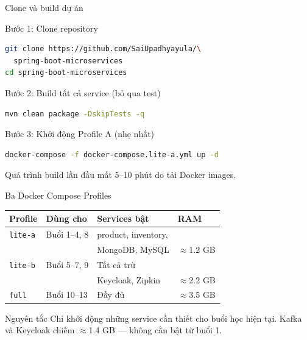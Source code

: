 \documentclass[aspectratio=169,12pt]{beamer}
\begin{document}
\begin{frame}[fragile]{Clone và build dự án}
  \begin{block}{Bước 1: Clone repository}
\begin{lstlisting}[language=bash]
git clone https://github.com/SaiUpadhyayula/\
  spring-boot-microservices
cd spring-boot-microservices
\end{lstlisting}
  \end{block}

  \begin{block}{Bước 2: Build tất cả service (bỏ qua test)}
\begin{lstlisting}[language=bash]
mvn clean package -DskipTests -q
\end{lstlisting}
  \end{block}

  \begin{block}{Bước 3: Khởi động Profile A (nhẹ nhất)}
\begin{lstlisting}[language=bash]
docker-compose -f docker-compose.lite-a.yml up -d
\end{lstlisting}
  \end{block}

  Quá trình build lần đầu mất 5--10 phút do tải Docker images.
\end{frame}

\begin{frame}{Ba Docker Compose Profiles}
  \begin{center}
  \begin{tabular}{llll}
    \toprule
    \textbf{Profile} & \textbf{Dùng cho} & \textbf{Services bật} & \textbf{RAM} \\
    \midrule
    \texttt{lite-a} &
    Buổi 1--4, 8 &
    product, inventory,\\
    & & MongoDB, MySQL &
    $\approx$1.2 GB \\
    \midrule
    \texttt{lite-b} &
    Buổi 5--7, 9 &
    Tất cả trừ\\
    & & Keycloak, Zipkin &
    $\approx$2.2 GB \\
    \midrule
    \texttt{full} &
    Buổi 10--13 &
    Đầy đủ &
    $\approx$3.5 GB \\
    \bottomrule
  \end{tabular}
  \end{center}

  \vspace{0.5em}
  \begin{alertblock}{Nguyên tắc}
    Chỉ khởi động những service cần thiết cho buổi học hiện tại.
    Kafka và Keycloak chiếm $\approx$1.4 GB --- không cần bật từ buổi 1.
  \end{alertblock}
\end{frame}
\end{document}

